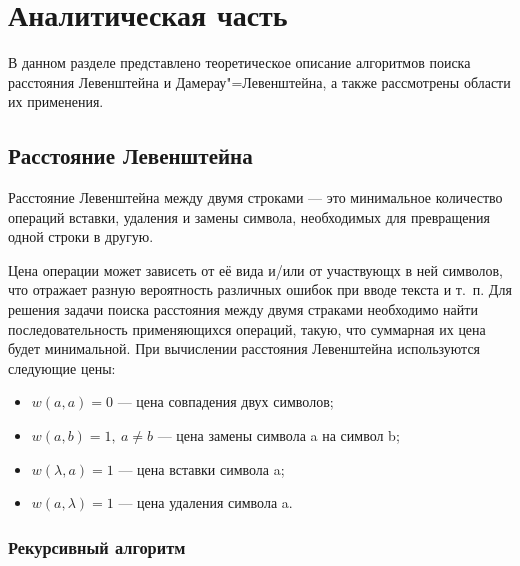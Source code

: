\chapter{Аналитическая часть}

В данном разделе представлено теоретическое описание алгоритмов поиска
расстояния Левенштейна и Дамерау"=Левенштейна, а также рассмотрены области их
применения.

\section{Расстояние Левенштейна}

Расстояние Левенштейна\cite{bib01} между двумя строками --- это минимальное
количество операций вставки, удаления и замены символа, необходимых для
превращения одной строки в другую.

Цена операции может зависеть от её вида и/или от участвующх в ней символов, что
отражает разную вероятность различных ошибок при вводе текста и т.~п. Для
решения задачи поиска расстояния между двумя страками необходимо найти
последовательность применяющихся операций, такую, что суммарная их цена будет
минимальной. При вычислении расстояния Левенштейна используются следующие цены:

\begin{itemize}
    \item $w(a, a) = 0$ --- цена совпадения двух символов;
    \item $w(a, b) = 1,~a \neq b$ --- цена замены символа a на символ b;
    \item $w(\lambda, a) = 1$ --- цена вставки символа a;
    \item $w(a, \lambda) = 1$ --- цена удаления символа a.
\end{itemize}

\subsection{Рекурсивный алгоритм}

